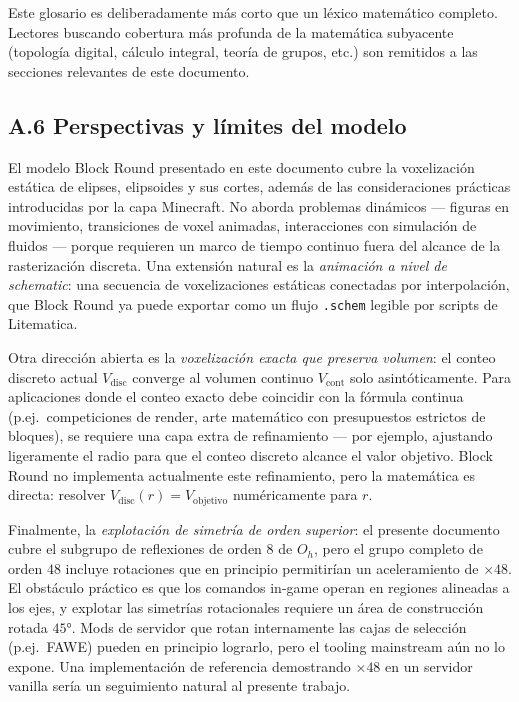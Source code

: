 \documentclass[12pt,a4paper]{scrartcl}
\newcommand{\code}[1]{\texttt{\small #1}}
\begin{document}
Este glosario es deliberadamente más corto que un léxico matemático completo. Lectores buscando cobertura más profunda de la matemática subyacente (topología digital, cálculo integral, teoría de grupos, etc.) son remitidos a las secciones relevantes de este documento.

\subsection*{A.6 Perspectivas y límites del modelo}

El modelo Block Round presentado en este documento cubre la voxelización estática de elipses, elipsoides y sus cortes, además de las consideraciones prácticas introducidas por la capa Minecraft. No aborda problemas dinámicos --- figuras en movimiento, transiciones de voxel animadas, interacciones con simulación de fluidos --- porque requieren un marco de tiempo continuo fuera del alcance de la rasterización discreta. Una extensión natural es la \emph{animación a nivel de schematic}: una secuencia de voxelizaciones estáticas conectadas por interpolación, que Block Round ya puede exportar como un flujo \code{.schem} legible por scripts de Litematica.

Otra dirección abierta es la \emph{voxelización exacta que preserva volumen}: el conteo discreto actual $V_{\mathrm{disc}}$ converge al volumen continuo $V_{\mathrm{cont}}$ solo asintóticamente. Para aplicaciones donde el conteo exacto debe coincidir con la fórmula continua (p.ej.\ competiciones de render, arte matemático con presupuestos estrictos de bloques), se requiere una capa extra de refinamiento --- por ejemplo, ajustando ligeramente el radio para que el conteo discreto alcance el valor objetivo. Block Round no implementa actualmente este refinamiento, pero la matemática es directa: resolver $V_{\mathrm{disc}}(r) = V_{\mathrm{objetivo}}$ numéricamente para $r$.

Finalmente, la \emph{explotación de simetría de orden superior}: el presente documento cubre el subgrupo de reflexiones de orden $8$ de $O_h$, pero el grupo completo de orden $48$ incluye rotaciones que en principio permitirían un aceleramiento de $\times 48$. El obstáculo práctico es que los comandos in-game operan en regiones alineadas a los ejes, y explotar las simetrías rotacionales requiere un área de construcción rotada $45°$. Mods de servidor que rotan internamente las cajas de selección (p.ej.\ FAWE) pueden en principio lograrlo, pero el tooling mainstream aún no lo expone. Una implementación de referencia demostrando $\times 48$ en un servidor vanilla sería un seguimiento natural al presente trabajo.
\end{document}
